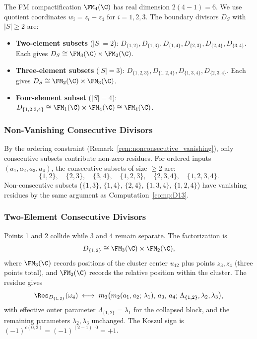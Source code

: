 The FM compactification $\FM_4(\C)$ has real dimension $2(4-1) = 6$. We use quotient coordinates $w_i = z_i - z_4$ for $i = 1, 2, 3$. The boundary divisors $D_S$ with $|S| \geq 2$ are:
\begin{itemize}
\item \textbf{Two-element subsets} ($|S|=2$): $D_{\{1,2\}}, D_{\{1,3\}}, D_{\{1,4\}}, D_{\{2,3\}}, D_{\{2,4\}}, D_{\{3,4\}}$. Each gives $D_S \cong \FM_3(\C) \times \FM_2(\C)$.
\item \textbf{Three-element subsets} ($|S|=3$): $D_{\{1,2,3\}}, D_{\{1,2,4\}}, D_{\{1,3,4\}}, D_{\{2,3,4\}}$. Each gives $D_S \cong \FM_2(\C) \times \FM_3(\C)$.
\item \textbf{Four-element subset} ($|S|=4$): $D_{\{1,2,3,4\}} \cong \FM_1(\C) \times \FM_4(\C) \cong \FM_4(\C)$.
\end{itemize}

\subsubsection{Non-Vanishing Consecutive Divisors}

By the ordering constraint (Remark~\ref{rem:nonconsecutive_vanishing}), only consecutive subsets contribute non-zero residues. For ordered inputs $(a_1, a_2, a_3, a_4)$, the consecutive subsets of size $\geq 2$ are:
\[
\{1,2\},\quad \{2,3\},\quad \{3,4\},\quad \{1,2,3\},\quad \{2,3,4\},\quad \{1,2,3,4\}.
\]
Non-consecutive subsets ($\{1,3\}$, $\{1,4\}$, $\{2,4\}$, $\{1,3,4\}$, $\{1,2,4\}$) have vanishing residues by the same argument as Computation~\ref{comp:D13}.

\subsubsection{Two-Element Consecutive Divisors}

\begin{computation}[$D_{\{1,2\}}$ in $\FM_4(\C)$]
Points 1 and 2 collide while 3 and 4 remain separate. The factorization is
\[
D_{\{1,2\}} \cong \FM_3(\C) \times \FM_2(\C),
\]
where $\FM_3(\C)$ records positions of the cluster center $u_{12}$ plus points $z_3, z_4$ (three points total), and $\FM_2(\C)$ records the relative position within the cluster. The residue gives
\[
\Res_{D_{\{1,2\}}}(\omega_4) \;\longleftrightarrow\; m_3\bigl(m_2(a_1, a_2;\, \lambda_1),\, a_3,\, a_4;\, \Lambda_{\{1,2\}}, \lambda_2, \lambda_3\bigr),
\]
with effective outer parameter $\Lambda_{\{1,2\}} = \lambda_1$ for the collapsed block, and the remaining parameters $\lambda_2, \lambda_3$ unchanged. The Koszul sign is $(-1)^{\epsilon(0,2)} = (-1)^{(2-1)\cdot 0} = +1$.
\end{computation}

